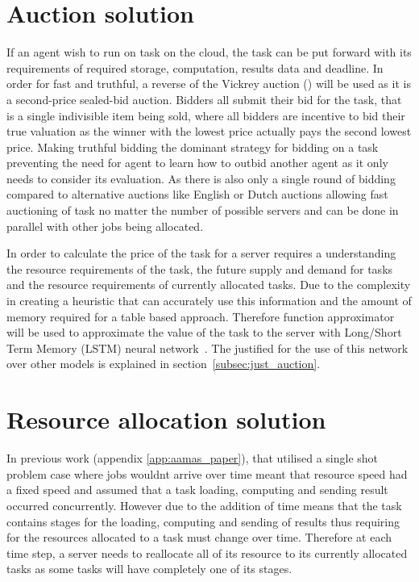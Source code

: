 \documentclass[sotoncolour]{extra/uosproject}     %
\begin{document}
\section{Auction solution}\label{subsec:auction_solution}
If an agent wish to run on task on the cloud, the task can be put forward with its requirements of required storage, computation, results data and deadline. In order for fast and truthful, a reverse of the Vickrey auction (\cite{vickrey}) will be used as it is a second-price sealed-bid auction. Bidders all submit their bid for the task, that is a single indivisible item being sold, where all bidders are incentive to bid their true valuation as the winner with the lowest price actually pays the second lowest price. Making truthful bidding the dominant strategy for bidding on a task preventing the need for agent to learn how to outbid another agent as it only needs to consider its evaluation. As there is also only a single round of bidding compared to alternative auctions like English or Dutch auctions allowing fast auctioning of task no matter the number of possible servers and can be done in parallel with other jobs being allocated. %

In order to calculate the price of the task for a server requires a understanding the resource requirements of the task, the future supply and demand for tasks and the resource requirements of currently allocated tasks. Due to the complexity in creating a heuristic that can accurately use this information and the amount of memory required for a table based approach. Therefore function approximator will be used to approximate the value of the task to the server with Long/Short Term Memory (LSTM) neural network~\cite{LSTM}. The justified for the use of this network over other models is explained in section~\ref{subsec:just_auction}. 

\section{Resource allocation solution}\label{subsec:resource_allocation}
In previous work (appendix \ref{app:aamas_paper}), that utilised a single shot problem case where jobs wouldnt arrive over time meant that resource speed had a fixed speed and assumed that a task loading, computing and sending result occurred concurrently. However due to the addition of time means that the task contains stages for the loading, computing and sending of results thus requiring for the resources allocated to a task must change over time. Therefore at each time step, a server needs to reallocate all of its resource to its currently allocated tasks as some tasks will have completely one of its stages. 
\end{document}
